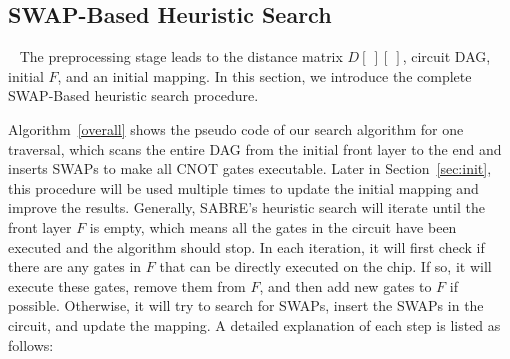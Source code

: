 \documentclass[journal,10pt,twocolumn]{IEEEtran}
\newcommand{\myalgorithmname}{SABRE}
\begin{document}
\subsection{SWAP-Based Heuristic Search}~\label{sec:flow}
The preprocessing stage leads to the distance matrix $D[~][~]$, circuit DAG, initial $F$, and an initial mapping. 
In this section, we introduce the complete SWAP-Based heuristic search procedure. 



\begin{algorithm}
\SetAlgoLined
 

\caption{\myalgorithmname's SWAP-based Heuristic Search}
\label{overall}
\end{algorithm}

 Algorithm~\ref{overall} shows the pseudo code of our search algorithm for one traversal, which scans the entire DAG from the initial front layer to the end and inserts SWAPs to make all CNOT gates executable. 
Later in Section~\ref{sec:init}, this procedure will be used multiple times %
to update the initial mapping and improve the results.
Generally, \myalgorithmname's heuristic search will iterate until the front layer $F$ is empty, which means all the gates in the circuit have been executed and the algorithm should stop.
In each iteration, it will first check if there are any gates in $F$ that can be directly executed on the chip. 
If so, it will execute these gates, remove them from $F$, and then add new gates to $F$ if possible. 
Otherwise, it will try to search for SWAPs, insert the SWAPs in the circuit, and update the mapping. 
A detailed explanation of each step  is listed as follows:
\end{document}
